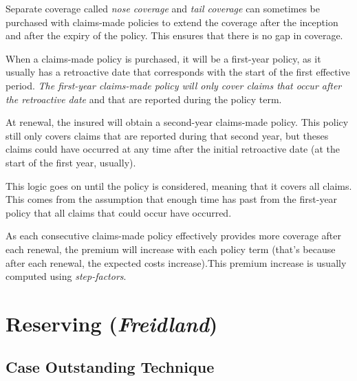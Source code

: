 \documentclass[11pt, english]{memoir}
\numberwithin{definition}{section}
\begin{document}
Separate coverage called \emph{nose coverage} and \emph{tail coverage} can sometimes be purchased with claims-made policies to extend the coverage after the inception and after the expiry of the policy. This ensures that there is no gap in coverage. 

When a claims-made policy is purchased, it will be a first-year policy, as it usually has a retroactive date that corresponds with the start of the first effective period. \emph{The first-year claims-made policy will only cover claims that occur after the retroactive date} and that are reported during the policy term. 

At renewal, the insured will obtain a second-year claims-made policy. This policy still only covers claims that are reported during that second year, but theses claims could have occurred at any time after the initial retroactive date (at the start of the first year, usually). 

This logic goes on until the policy is considered, meaning that it covers all claims. This comes from the assumption that enough time has past from the first-year policy that all claims that could occur have occurred. 


As each consecutive claims-made policy effectively provides more coverage after each renewal, the premium will increase with each policy term (that's because after each renewal, the expected costs increase).This premium increase is usually computed using \emph{step-factors}. 































\part{Reserving (\emph{Freidland})}
	
	
	





\chapter{Case Outstanding Technique}
\end{document}
